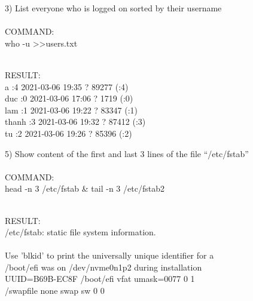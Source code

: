 \documentclass{article}
\begin{document}
\newpage

\begin{tcolorbox}
3) List everyone who is logged on sorted by their username
\\
\\COMMAND:
\\who -u \textgreater \textgreater users.txt
\end{tcolorbox}

\begin{tcolorbox}
\\RESULT:
\\a           :4           2021-03-06 19:35   ?         89277 (:4)
\\duc        :0           2021-03-06 17:06   ?          1719 (:0)
\\lam        :1           2021-03-06 19:22   ?         83347 (:1)
\\thanh     :3           2021-03-06 19:32   ?         87412 (:3)
\\tu          :2           2021-03-06 19:26   ?         85396 (:2)
\end{tcolorbox}

\begin{tcolorbox}
5) Show content of the first and last 3 lines of the file “/etc/fstab”
\\
\\COMMAND:
\\head -n 3 /etc/fstab & tail -n 3 /etc/fstab2
\end{tcolorbox}

\begin{tcolorbox}
\\RESULT:
\\/etc/fstab: static file system information.
\\
\\Use 'blkid' to print the universally unique identifier for a
\\/boot/efi was on /dev/nvme0n1p2 during installation
\\UUID=B69B-EC8F  /boot/efi       vfat    umask=0077      0       1
\\/swapfile                                 none            swap    sw              0       0
\end{tcolorbox}
\end{document}
